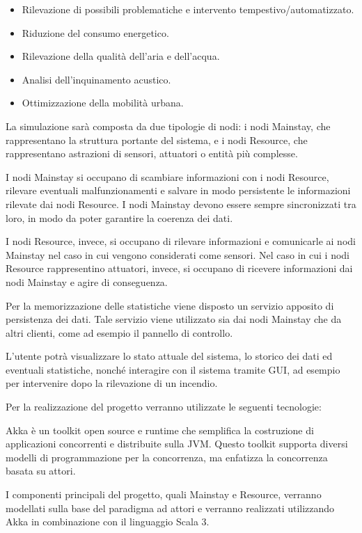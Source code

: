\documentclass[12pt]{article}
\begin{document}
\begin{itemize}
    \item Rilevazione di possibili problematiche e intervento tempestivo/automatizzato.
    \item Riduzione del consumo energetico.
    \item Rilevazione della qualità dell'aria e dell'acqua.
    \item Analisi dell'inquinamento acustico.
    \item Ottimizzazione della mobilità urbana.
\end{itemize}

La simulazione sarà composta da due tipologie di nodi: i nodi Mainstay, che rappresentano la struttura portante del sistema, e i nodi Resource, che rappresentano astrazioni di sensori, attuatori o entità più complesse.

I nodi Mainstay si occupano di scambiare informazioni con i nodi Resource, rilevare eventuali malfunzionamenti e salvare in modo persistente le informazioni rilevate dai nodi Resource. I nodi Mainstay devono essere sempre sincronizzati tra loro, in modo da poter garantire la coerenza dei dati.

I nodi Resource, invece, si occupano di rilevare informazioni e comunicarle ai nodi Mainstay nel caso in cui vengono considerati come sensori. Nel caso in cui i nodi Resource rappresentino attuatori, invece, si occupano di ricevere informazioni dai nodi Mainstay e agire di conseguenza.

Per la memorizzazione delle statistiche viene disposto un servizio apposito di persistenza dei dati. Tale servizio viene utilizzato sia dai nodi Mainstay che da altri clienti, come ad esempio il pannello di controllo.

L'utente potrà visualizzare lo stato attuale del sistema, lo storico dei dati ed eventuali statistiche, nonché interagire con il sistema tramite GUI, ad esempio per intervenire dopo la rilevazione di un incendio.

Per la realizzazione del progetto verranno utilizzate le seguenti tecnologie:

Akka è un toolkit open source e runtime che semplifica la costruzione di applicazioni concorrenti e distribuite sulla JVM. Questo toolkit supporta diversi modelli di programmazione per la concorrenza, ma enfatizza la concorrenza basata su attori.

I componenti principali del progetto, quali Mainstay e Resource, verranno modellati sulla base del paradigma ad attori e verranno realizzati utilizzando Akka in combinazione con il linguaggio Scala 3.
\end{document}
